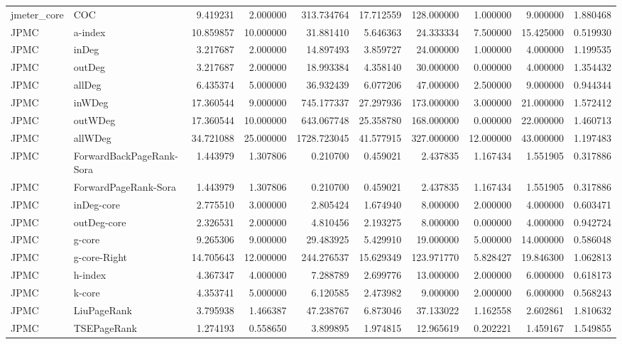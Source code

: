 \begin{tabular}{llrrrrrrrr}
jmeter_core & COC & 9.419231 & 2.000000 & 313.734764 & 17.712559 & 128.000000 & 1.000000 & 9.000000 & 1.880468 \\
JPMC & a-index & 10.859857 & 10.000000 & 31.881410 & 5.646363 & 24.333334 & 7.500000 & 15.425000 & 0.519930 \\
JPMC & inDeg & 3.217687 & 2.000000 & 14.897493 & 3.859727 & 24.000000 & 1.000000 & 4.000000 & 1.199535 \\
JPMC & outDeg & 3.217687 & 2.000000 & 18.993384 & 4.358140 & 30.000000 & 0.000000 & 4.000000 & 1.354432 \\
JPMC & allDeg & 6.435374 & 5.000000 & 36.932439 & 6.077206 & 47.000000 & 2.500000 & 9.000000 & 0.944344 \\
JPMC & inWDeg & 17.360544 & 9.000000 & 745.177337 & 27.297936 & 173.000000 & 3.000000 & 21.000000 & 1.572412 \\
JPMC & outWDeg & 17.360544 & 10.000000 & 643.067748 & 25.358780 & 168.000000 & 0.000000 & 22.000000 & 1.460713 \\
JPMC & allWDeg & 34.721088 & 25.000000 & 1728.723045 & 41.577915 & 327.000000 & 12.000000 & 43.000000 & 1.197483 \\
JPMC & ForwardBackPageRank-Sora & 1.443979 & 1.307806 & 0.210700 & 0.459021 & 2.437835 & 1.167434 & 1.551905 & 0.317886 \\
JPMC & ForwardPageRank-Sora & 1.443979 & 1.307806 & 0.210700 & 0.459021 & 2.437835 & 1.167434 & 1.551905 & 0.317886 \\
JPMC & inDeg-core & 2.775510 & 3.000000 & 2.805424 & 1.674940 & 8.000000 & 2.000000 & 4.000000 & 0.603471 \\
JPMC & outDeg-core & 2.326531 & 2.000000 & 4.810456 & 2.193275 & 8.000000 & 0.000000 & 4.000000 & 0.942724 \\
JPMC & g-core & 9.265306 & 9.000000 & 29.483925 & 5.429910 & 19.000000 & 5.000000 & 14.000000 & 0.586048 \\
JPMC & g-core-Right & 14.705643 & 12.000000 & 244.276537 & 15.629349 & 123.971770 & 5.828427 & 19.846300 & 1.062813 \\
JPMC & h-index & 4.367347 & 4.000000 & 7.288789 & 2.699776 & 13.000000 & 2.000000 & 6.000000 & 0.618173 \\
JPMC & k-core & 4.353741 & 5.000000 & 6.120585 & 2.473982 & 9.000000 & 2.000000 & 6.000000 & 0.568243 \\
JPMC & LiuPageRank & 3.795938 & 1.466387 & 47.238767 & 6.873046 & 37.133022 & 1.162558 & 2.602861 & 1.810632 \\
JPMC & TSEPageRank & 1.274193 & 0.558650 & 3.899895 & 1.974815 & 12.965619 & 0.202221 & 1.459167 & 1.549855 \\

\end{tabular}
